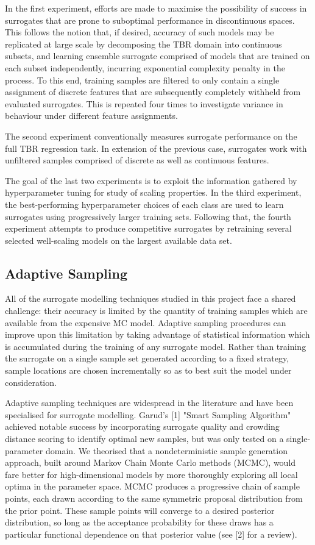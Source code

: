 In the first experiment, efforts are made to maximise the possibility of success
in surrogates that are prone to suboptimal performance in discontinuous spaces.
This follows the notion that, if desired, accuracy of such models may be
replicated at large scale by decomposing the TBR domain into continuous subsets,
and learning ensemble surrogate comprised of models that are trained on each
subset independently, incurring exponential complexity penalty in the process.
To this end, training samples are filtered to only contain a single assignment
of discrete features that are subsequently completely withheld from evaluated
surrogates. This is repeated four times to investigate variance in behaviour
under different feature assignments.

The second experiment conventionally measures surrogate performance on the full
TBR regression task. In extension of the previous case, surrogates work with
unfiltered samples comprised of discrete as well as continuous features.

The goal of the last two experiments is to exploit the information gathered by
hyperparameter tuning for study of scaling properties. In
the third experiment, the best-performing hyperparameter choices of each class
are used to learn surrogates using progressively larger training sets. Following
that, the fourth experiment attempts to produce competitive surrogates by
retraining several selected well-scaling models on the largest available data set.


\subsection{Adaptive Sampling}
\label{sec:adaptive}

All of the surrogate modelling techniques studied in this project face a shared challenge: their accuracy is limited by the quantity of training samples which are available from the expensive MC model. Adaptive sampling procedures can improve upon this limitation by taking advantage of statistical information which is accumulated during the training of any surrogate model. Rather than training the surrogate on a single sample set generated according to a fixed strategy, sample locations are chosen incrementally so as to best suit the model under consideration.

Adaptive sampling techniques are widespread in the literature and have been specialised for surrogate modelling. Garud's [1] "Smart Sampling Algorithm" achieved notable success by incorporating surrogate quality and crowding distance scoring to identify optimal new samples, but was only tested on a single-parameter domain. We theorised that a nondeterministic sample generation approach, built around Markov Chain Monte Carlo methods (MCMC), would fare better for high-dimensional models by more thoroughly exploring all local optima in the parameter space. MCMC produces a progressive chain of sample points, each drawn according to the same symmetric proposal distribution from the prior point. These sample points will converge to a desired posterior distribution, so long as the acceptance probability for these draws has a particular functional dependence on that posterior value (see [2] for a review). 

